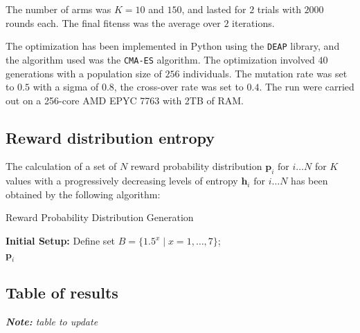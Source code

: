 \noindent The number of arms was $K=10$ and $150$, and lasted for $2$ trials with $2000$ rounds each.
The final fitenss was the average over $2$ iterations.

\hfill \break
The optimization has been implemented in Python using the \texttt{DEAP} library, and the algorithm used was the \texttt{CMA-ES} algorithm. The optimization involved $40$ generations with a population size of $256$ individuals. The mutation rate was set to $0.5$ with a sigma of $0.8$, the cross-over rate was set to $0.4$.
The run were carried out on a 256-core AMD EPYC 7763 with 2TB of RAM.


\subsection{Reward distribution entropy}\label{sec:appendix_entropy}

\noindent The calculation of a set of $N$ reward probability distribution $\mathbf{p}_{i}\text{  for  } i\ldots N$ for $K$ values with a progressively decreasing levels of entropy $\mathbf{h}_{i}\text{  for  } i\ldots N$ has been obtained by the following algorithm:

\begin{algorithm}[ht]
\caption{Reward Probability Distribution Generation}
\label{alg:reward_distribution}
\SetAlgoLined
{}
\textbf{Initial Setup:}
Define set $B = \{1.5^x \mid x = 1, \ldots, 7\}$; \\
\Return ${\mathbf{p}_i}$
\end{algorithm}


\subsection{Table of results}

\textit{\textbf{Note:} table to update}

